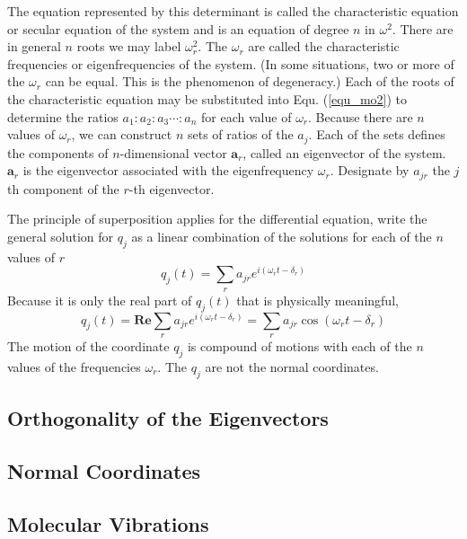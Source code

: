 \documentclass[11pt,a4paper]{article}
\renewcommand{\vec}[1]{\boldsymbol{#1}}
\begin{document}
The equation represented by this determinant is called the characteristic equation or secular equation of the system and is an equation of degree $n$ in $\omega^2$. There are in general $n$ roots we may label $\omega_r^2$. The $\omega_r$ are called the characteristic frequencies or eigenfrequencies of the system. (In some situations, two or more of the $\omega_r$ can be equal. This is the phenomenon of degeneracy.) Each of the roots of the characteristic equation may be substituted into Equ. (\ref{equ_mo2}) to determine the ratios $a_1:a_2:a_3\cdots:a_n$ for each value of $\omega_r$. Because there are $n$ values of $\omega_r$, we can construct $n$ sets of ratios of the $a_j$. Each of the sets defines the components of $n$-dimensional vector $\vec{a}_r$, called an eigenvector of the system. $\vec{a}_r$ is the eigenvector associated with the eigenfrequency $\omega_r$. Designate by $a_{jr}$ the $j$th component of the $r$-th eigenvector.

The principle of superposition applies for the differential equation, write the general solution for $q_j$ as a linear combination of the solutions for each of the $n$ values of $r$
\begin{equation}
q_j(t) = \sum_r a_{jr} e^{i(\omega_r t-\delta_r)}
\end{equation}
Because it is only the real part of $q_j(t)$ that is physically meaningful,
\begin{equation}
q_j(t) = \textbf{Re}\sum_r a_{jr} e^{i(\omega_r t-\delta_r)} = \sum_r a_{jr} \cos(\omega_r t-\delta_r)
\end{equation}
The motion of the coordinate $q_j$ is compound of motions with each of the $n$ values of the frequencies $\omega_r$. The $q_j$ are not the normal coordinates.





\subsection{Orthogonality of the Eigenvectors}





\subsection{Normal Coordinates}





\subsection{Molecular Vibrations}
\end{document}
